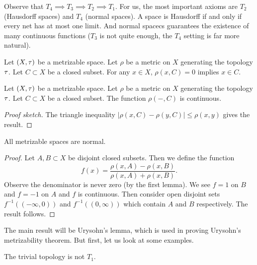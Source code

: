 \begin{node}
Observe that $T_{4}\implies T_{3}\implies T_{2}\implies T_{1}$.
For us, the most important axioms are $T_{2}$ (Hausdorff spaces) and
$T_{4}$ (normal spaces). A space is Hausdorff if and only if every net
has at most one limit. And normal spacecs guarantees the existence of
many continuous functions ($T_{3}$ is not quite enough, the $T_{4}$
setting is far more natural).
\end{node}

\begin{lemma}
Let $(X,\tau)$ be a metrizable space. Let $\rho$ be a metric on
$X$ generating the topology $\tau$. Let $C\subset X$ be a closed
subset. For any $x\in X$, $\rho(x,C)=0$ implies $x\in C$.
\end{lemma}

\begin{lemma}
Let $(X,\tau)$ be a metrizable space. Let $\rho$ be a metric on
$X$ generating the topology $\tau$. Let $C\subset X$ be a closed
subset. The function $\rho(-,C)$ is continuous.
\end{lemma}

\begin{proof}[Proof sketch]
The triangle inequality $|\rho(x,C)-\rho(y,C)|\leq\rho(x,y)$ gives the result.
\end{proof}

\begin{theorem}
All metrizable spaces are normal.
\end{theorem}

\begin{proof}
Let $A, B\subset X$ be disjoint closed subsets. Then we define the function
\begin{equation}
f(x) = \frac{\rho(x,A)-\rho(x,B)}{\rho(x,A)+\rho(x,B)}.
\end{equation}
Observe the denominator is never zero (by the first lemma). We see
$f=1$ on $B$ and $f=-1$ on $A$ and $f$ is continuous. Then consider
open disjoint sets $f^{-1}((-\infty,0))$ and $f^{-1}((0,\infty))$
which contain $A$ and $B$ respectively. The result follows.
\end{proof}

\begin{remark}
The main result will be Urysohn's lemma, which is used in proving
Urysohn's metrizability theorem. But first, let us look at some examples.
\end{remark}

\begin{example}
The trivial topology is not $T_{1}$.
\end{example}


